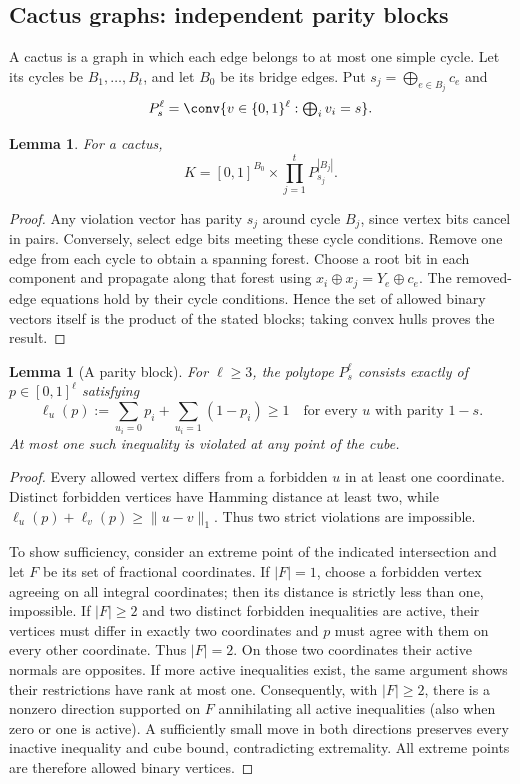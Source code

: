 \documentclass[11pt,a4paper]{article}
\newtheorem{lemma}[theorem]{Lemma}
\theoremstyle{definition}\newtheorem{definition}[theorem]{Definition}
\theoremstyle{remark}\newtheorem{remark}[theorem]{Remark}
\numberwithin{equation}{section}
\begin{document}
\subsection{Cactus graphs: independent parity blocks}\label{R08-sec-2}
A cactus is a graph in which each edge belongs to at most one simple cycle. Let its cycles be $B_1,\ldots,B_t$, and let $B_0$ be its bridge edges. Put $s_j=\bigoplus_{e\in B_j}c_e$ and
\[
 P_s^{\ell}=\conv\{v\in\{0,1\}^{\ell}:\textstyle\bigoplus_i v_i=s\}.
\]
\begin{lemma}\label{R08-product}
For a cactus,
\[
 K=[0,1]^{B_0}\times\prod_{j=1}^t P_{s_j}^{|B_j|}.
\]
\end{lemma}
\begin{proof}
Any violation vector has parity $s_j$ around cycle $B_j$, since vertex bits cancel in pairs. Conversely, select edge bits meeting these cycle conditions. Remove one edge from each cycle to obtain a spanning forest. Choose a root bit in each component and propagate along that forest using $x_i\oplus x_j=Y_e\oplus c_e$. The removed-edge equations hold by their cycle conditions. Hence the set of allowed binary vectors itself is the product of the stated blocks; taking convex hulls proves the result.
\end{proof}

\begin{lemma}[A parity block]\label{R08-parity}
For $\ell\ge3$, the polytope $P_s^{\ell}$ consists exactly of $p\in[0,1]^\ell$ satisfying
\begin{equation}\label{R08-facet}
 \ell_u(p):=\sum_{u_i=0}p_i+\sum_{u_i=1}(1-p_i)\ge1
 \quad\text{for every }u\text{ with parity }1-s.
\end{equation}
At most one such inequality is violated at any point of the cube.
\end{lemma}
\begin{proof}
Every allowed vertex differs from a forbidden $u$ in at least one coordinate. Distinct forbidden vertices have Hamming distance at least two, while $\ell_u(p)+\ell_v(p)\ge\|u-v\|_1$. Thus two strict violations are impossible.

To show sufficiency, consider an extreme point of the indicated intersection and let $F$ be its set of fractional coordinates. If $|F|=1$, choose a forbidden vertex agreeing on all integral coordinates; then its distance is strictly less than one, impossible. If $|F|\ge2$ and two distinct forbidden inequalities are active, their vertices must differ in exactly two coordinates and $p$ must agree with them on every other coordinate. Thus $|F|=2$. On those two coordinates their active normals are opposites. If more active inequalities exist, the same argument shows their restrictions have rank at most one. Consequently, with $|F|\ge2$, there is a nonzero direction supported on $F$ annihilating all active inequalities (also when zero or one is active). A sufficiently small move in both directions preserves every inactive inequality and cube bound, contradicting extremality. All extreme points are therefore allowed binary vertices.
\end{proof}
\end{document}
